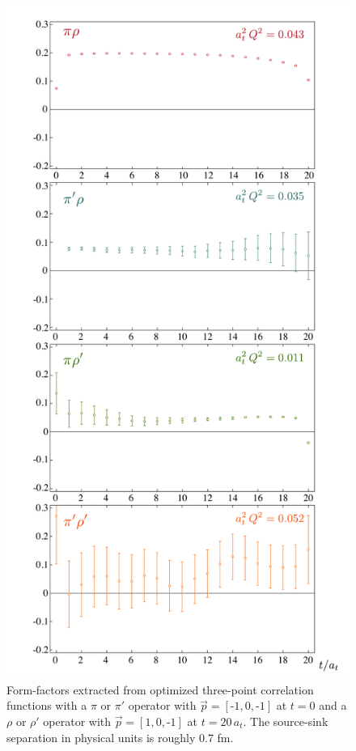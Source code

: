 \documentclass[twocolumn,amsmath,amssymb,prd,10pt,floatfix, 
superscriptaddress,nofootinbib, showpacs, preprintnumbers]{revtex4-1}
\begin{document}
\begin{figure}[b]
\includegraphics[width=1.03\linewidth]{fig7.pdf}
\caption{ Form-factors extracted from optimized three-point correlation functions with a $\pi$ or $\pi'$ operator with ${\vec{p}=[\text{-}1,0,\text{-}1]}$ at $t=0$ and a $\rho$ or $\rho'$ operator with ${\vec{p}=[1,0,\text{-}1]}$ at $t= 20\,a_t$. The source-sink separation in physical units is roughly 
0.7 fm. \label{rhopiproj}
}
\end{figure}
\end{document}
